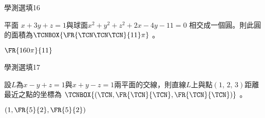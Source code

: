 \begin{QUESTIONS}
    \begin{QUESTION}
        \begin{ExamInfo}{83}{學測}{選填}{16}
        \end{ExamInfo}
        \begin{ExamAnsRateInfo}{}{}{}{}
        \end{ExamAnsRateInfo}
        \begin{QBODY}
            平面 $x+3y+z=1$與球面$x^2 +y^2 +z^2 +2x-4y-11=0$ 相交成一個圓。則此圓的面積為$\TCNBOX{\FR{\TCN\TCN\TCN}{11}\pi}$ 。
        \end{QBODY}
        \begin{QFROMS}
        \end{QFROMS}
        \begin{QTAGS}\end{QTAGS}
        \begin{QANS}
            $\FR{160 \pi }{11}$
        \end{QANS}
        \begin{QSOLLIST}
        \end{QSOLLIST}
        \begin{QEMPTYSPACE}
        \end{QEMPTYSPACE}
    \end{QUESTION}
    \begin{QUESTION}
        \begin{ExamInfo}{83}{學測}{選填}{17}
        \end{ExamInfo}
        \begin{ExamAnsRateInfo}{}{}{}{}
        \end{ExamAnsRateInfo}
        \begin{QBODY}
            設$L$為$x-y+z=1$與$x+y-z=1$兩平面的交線，則直線$L$上與點$\left( 1,\,2,\,3 \right)$距離最近之點的坐標為  $\TCNBOX{(\TCN, \FR{\TCN}{\TCN}, \FR{\TCN}{\TCN})}$ 。
        \end{QBODY}
        \begin{QFROMS}
        \end{QFROMS}
        \begin{QTAGS}\end{QTAGS}
        \begin{QANS}
            $(1,\FR{5}{2}, \FR{5}{2})$
        \end{QANS}
        \begin{QSOLLIST}
        \end{QSOLLIST}
        \begin{QEMPTYSPACE}
        \end{QEMPTYSPACE}

\end{QUESTION}
\end{QUESTIONS}
